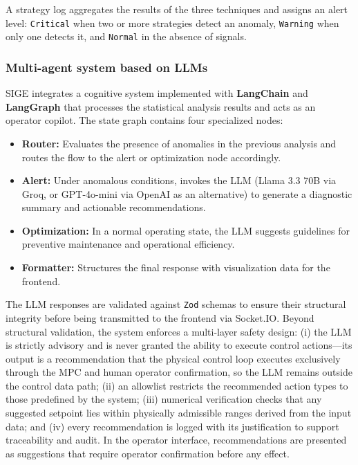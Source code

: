 \documentclass[journal,article,submit,pdftex,moreauthors]{Definitions/mdpi}
\begin{document}
A strategy log aggregates the results of the three techniques and assigns an alert level: \texttt{Critical} when two or more strategies detect an anomaly, \texttt{Warning} when only one detects it, and \texttt{Normal} in the absence of signals.

\subsubsection{Multi-agent system based on LLMs}
SIGE integrates a cognitive system implemented with \textbf{LangChain} and \textbf{LangGraph} that processes the statistical analysis results and acts as an operator copilot. The state graph contains four specialized nodes:
\begin{itemize}
    \item \textbf{Router:} Evaluates the presence of anomalies in the previous analysis and routes the flow to the alert or optimization node accordingly.
    \item \textbf{Alert:} Under anomalous conditions, invokes the LLM (Llama 3.3 70B via Groq, or GPT-4o-mini via OpenAI as an alternative) to generate a diagnostic summary and actionable recommendations.
    \item \textbf{Optimization:} In a normal operating state, the LLM suggests guidelines for preventive maintenance and operational efficiency.
    \item \textbf{Formatter:} Structures the final response with visualization data for the frontend.
\end{itemize}

The LLM responses are validated against \texttt{Zod} schemas to ensure their structural integrity before being transmitted to the frontend via Socket.IO. Beyond structural validation, the system enforces a multi-layer safety design: (i) the LLM is strictly advisory and is never granted the ability to execute control actions---its output is a recommendation that the physical control loop executes exclusively through the MPC and human operator confirmation, so the LLM remains outside the control data path; (ii) an allowlist restricts the recommended action types to those predefined by the system; (iii) numerical verification checks that any suggested setpoint lies within physically admissible ranges derived from the input data; and (iv) every recommendation is logged with its justification to support traceability and audit. In the operator interface, recommendations are presented as suggestions that require operator confirmation before any effect.
\end{document}
